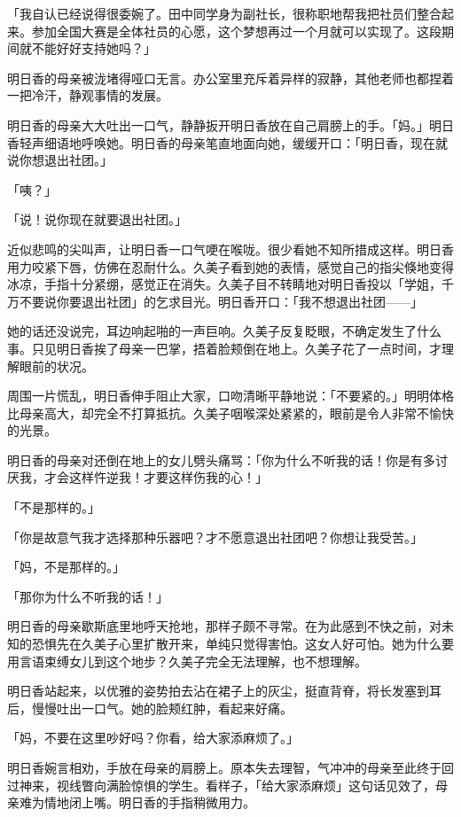 \documentclass[UTF8]{ctexart}
\begin{document}
    「我自认已经说得很委婉了。田中同学身为副社长，很称职地帮我把社员们整合起来。参加全国大赛是全体社员的心愿，这个梦想再过一个月就可以实现了。这段期间就不能好好支持她吗？」 

    明日香的母亲被泷堵得哑口无言。办公室里充斥着异样的寂静，其他老师也都捏着一把冷汗，静观事情的发展。 

    明日香的母亲大大吐出一口气，静静扳开明日香放在自己肩膀上的手。「妈。」明日香轻声细语地呼唤她。明日香的母亲笔直地面向她，缓缓开口：「明日香，现在就说你想退出社团。」 

    「咦？」 

    「说！说你现在就要退出社团。」 

    近似悲鸣的尖叫声，让明日香一口气哽在喉咙。很少看她不知所措成这样。明日香用力咬紧下唇，仿佛在忍耐什么。久美子看到她的表情，感觉自己的指尖倏地变得冰凉，手指十分紧绷，感觉正在消失。久美子目不转睛地对明日香投以「学姐，千万不要说你要退出社团」的乞求目光。明日香开口：「我不想退出社团——」 

    她的话还没说完，耳边响起啪的一声巨响。久美子反复眨眼，不确定发生了什么事。只见明日香挨了母亲一巴掌，捂着脸颊倒在地上。久美子花了一点时间，才理解眼前的状况。 

    周围一片慌乱，明日香伸手阻止大家，口吻清晰平静地说：「不要紧的。」明明体格比母亲高大，却完全不打算抵抗。久美子咽喉深处紧紧的，眼前是令人非常不愉快的光景。 

    明日香的母亲对还倒在地上的女儿劈头痛骂：「你为什么不听我的话！你是有多讨厌我，才会这样忤逆我！才要这样伤我的心！」 

    「不是那样的。」 

    「你是故意气我才选择那种乐器吧？才不愿意退出社团吧？你想让我受苦。」 

    「妈，不是那样的。」 

    「那你为什么不听我的话！」 

    明日香的母亲歇斯底里地呼天抢地，那样子颇不寻常。在为此感到不快之前，对未知的恐惧先在久美子心里扩散开来，单纯只觉得害怕。这女人好可怕。她为什么要用言语束缚女儿到这个地步？久美子完全无法理解，也不想理解。 

    明日香站起来，以优雅的姿势拍去沾在裙子上的灰尘，挺直背脊，将长发塞到耳后，慢慢吐出一口气。她的脸颊红肿，看起来好痛。 

    「妈，不要在这里吵好吗？你看，给大家添麻烦了。」 

    明日香婉言相劝，手放在母亲的肩膀上。原本失去理智，气冲冲的母亲至此终于回过神来，视线瞥向满脸惊惧的学生。看样子，「给大家添麻烦」这句话见效了，母亲难为情地闭上嘴。明日香的手指稍微用力。 
\end{document}
